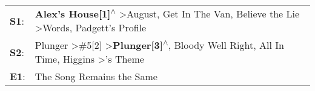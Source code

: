 \begin{supertabular}{p{0.03\textwidth}p{0.92\textwidth}}
 \textbf{S1}:  &                                       \textbf{Alex's House[1]\textsuperscript{$\wedge$}} \textgreater \enspace August\textsuperscript{}, \enspace Get In The Van\textsuperscript{}, \enspace Believe the Lie\textsuperscript{} \textgreater \enspace Words\textsuperscript{}, \enspace Padgett's Profile\textsuperscript{}  \enspace  \\
 \textbf{S2}:  &  Plunger\textsuperscript{} \textgreater \enspace \#5[2]\textsuperscript{} \textgreater \enspace \textbf{Plunger[3]\textsuperscript{$\wedge$}}, \enspace Bloody Well Right\textsuperscript{}, \enspace All In Time\textsuperscript{}, \enspace Higgins\textsuperscript{} \textgreater {}'s Theme\textsuperscript{}  \enspace  \\
 \textbf{E1}:  &                                                                                                                                                                                                                                                                                The Song Remains the Same\textsuperscript{}  \enspace  \\
\end{supertabular}
